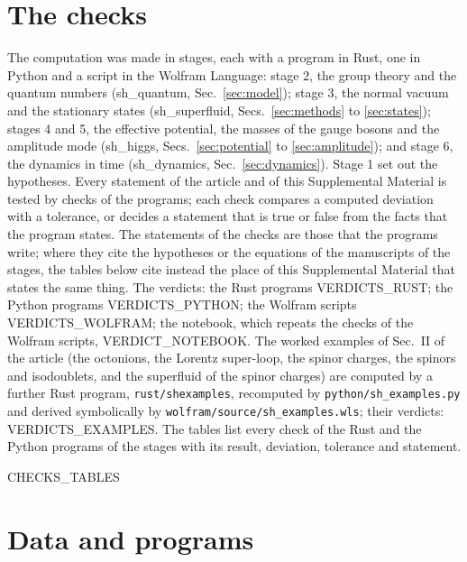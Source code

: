 \documentclass[aps,prd,onecolumn,superscriptaddress,nofootinbib,floatfix,longbibliography]{revtex4-2}
\begin{document}
\section{The checks}
\label{sec:checks}

The computation was made in stages, each with a program in Rust, one in Python and a script in the Wolfram Language:
stage 2, the group theory and the quantum numbers (sh\_quantum, Sec.~\ref{sec:model}); stage 3, the normal vacuum and the
stationary states (sh\_superfluid, Secs.~\ref{sec:methods} to \ref{sec:states}); stages 4 and 5, the effective potential,
the masses of the gauge bosons and the amplitude mode (sh\_higgs, Secs.~\ref{sec:potential} to \ref{sec:amplitude}); and
stage 6, the dynamics in time (sh\_dynamics, Sec.~\ref{sec:dynamics}). Stage 1 set out the hypotheses.
Every statement of the article and of this Supplemental Material is tested by checks of the programs; each check
compares a computed deviation with a tolerance, or decides a statement that is true or false from the facts that the
program states. The statements of the checks are those that the programs write; where they cite the hypotheses or the
equations of the manuscripts of the stages, the tables below cite instead the place of this Supplemental Material that
states the same thing. The verdicts: the Rust programs {{VERDICTS_RUST}}; the Python programs {{VERDICTS_PYTHON}}; the Wolfram
scripts {{VERDICTS_WOLFRAM}}; the notebook, which repeats the checks of the Wolfram scripts, {{VERDICT_NOTEBOOK}}. The
worked examples of Sec.~II of the article (the octonions, the Lorentz super-loop, the spinor charges, the spinors and
isodoublets, and the superfluid of the spinor charges) are computed by a further Rust program, \texttt{rust/shexamples},
recomputed by \texttt{python/sh\_examples.py} and derived symbolically by \texttt{wolfram/source/sh\_examples.wls}; their
verdicts: {{VERDICTS_EXAMPLES}}. The tables list every check of the Rust and the Python programs of the stages with its
result, deviation, tolerance and statement.

{{CHECKS_TABLES}}

\section{Data and programs}
\label{sec:data}
\end{document}
